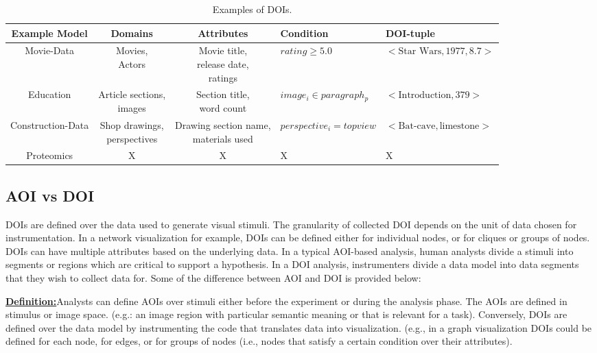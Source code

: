 \begin{table*}[htbp]
	\centering
		\begin{tabular}{|c|c|c|l|l|}
			\hline
	Example Model & Domains & Attributes & Condition& DOI-tuple\\\hline
	Movie-Data & \shortstack{Movies,\\ Actors} & \shortstack{Movie title,\\ release date,\\ ratings}& $rating \geq 5.0$& $<\text{Star Wars}, 1977, 8.7>$ \\\hline
	Education & \shortstack{Article sections,\\ images} & \shortstack{Section title,\\ word count} & $image_i \in paragraph_p$& $<\text{Introduction}, 379>$ \\\hline
	Construction-Data & \shortstack{Shop drawings,\\ perspectives} & \shortstack{Drawing section name,\\ materials used} & $perspective_i =topview$& $<\text{Bat-cave}, \text{limestone}>$ \\\hline
	Proteomics & X& X& X& X \\\hline
		\end{tabular}
		\caption{Examples of DOIs.}
		\label{tab:ExampleDOI}
\end{table*}

\subsection{AOI vs DOI}
\label{sec:AOIvDOI}

DOIs are defined over the data used to generate visual stimuli. The granularity of collected DOI depends on the unit of data chosen for instrumentation. In a network visualization for example, DOIs can be defined either for individual nodes, or for cliques or groups of nodes. DOIs can have multiple attributes based on the underlying data. 
In a typical AOI-based analysis, human analysts divide a stimuli into segments or regions which are critical to support a hypothesis. In a DOI analysis, instrumenters divide a data model into data segments that they wish to collect data for. Some of the difference between AOI and DOI is provided below: 

\textbf{\underline{Definition:}}Analysts can define AOIs over stimuli either before the experiment or during the analysis phase. The AOIs are defined in stimulus or image space. (e.g.: an image region with particular semantic meaning or that is relevant for a task). Conversely, DOIs are defined over the data model by instrumenting the code that translates data into visualization.   (e.g., in a graph visualization DOIs could be defined for each node, for edges, or for groups of nodes (i.e., nodes that satisfy a certain condition over their attributes).


